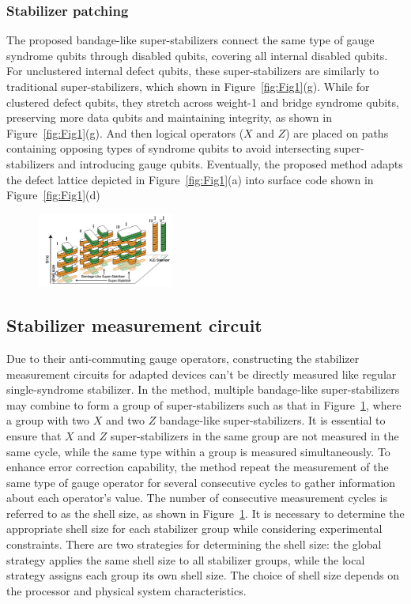 \subsubsection{Stabilizer patching}

The proposed bandage-like super-stabilizers connect the same type of gauge syndrome qubits through disabled qubits, covering all internal disabled qubits. For unclustered internal defect qubits, these super-stabilizers are similarly to traditional super-stabilizers, which shown in Figure~\ref{fig:Fig1}(g). While for clustered defect qubits, they stretch across weight-1 and bridge syndrome qubits, preserving more data qubits and maintaining integrity, as  shown in Figure~\ref{fig:Fig1}(g). And then logical operators ($X$ and $Z$) are placed on paths containing opposing types of syndrome qubits to avoid intersecting super-stabilizers and introducing gauge qubits. Eventually, the proposed method adapts the defect lattice depicted in Figure~\ref{fig:Fig1}(a) into surface code shown in Figure~\ref{fig:Fig1}(d)

\begin{figure}[ht]
    \centering
    \includegraphics[width=0.4\textwidth]{sections/4_stabilizer/Fig2.png}
    \caption{}
    \label{fig:Fig2}
\end{figure}

\subsection{Stabilizer measurement circuit} 

Due to their anti-commuting gauge operators, constructing the stabilizer measurement circuits for adapted devices can't be directly measured like regular single-syndrome stabilizer. In the method, multiple bandage-like super-stabilizers may combine to form a group of super-stabilizers such as that in Figure~\ref{fig:Fig2}, where a group with two $X$ and two $Z$ bandage-like super-stabilizers. It is essential to ensure that $X$ and $Z$ super-stabilizers in the same group are not measured in the same cycle, while the same type within a group is measured simultaneously.
To enhance error correction capability, the method repeat the measurement of the same type of gauge operator for several consecutive cycles to gather information about each operator's value. The number of consecutive measurement cycles is referred to as the shell size, as shown in Figure~\ref{fig:Fig2}. It is necessary to determine the appropriate shell size for each stabilizer group while considering experimental constraints. There are two strategies for determining the shell size: the global strategy applies the same shell size to all stabilizer groups, while the local strategy assigns each group its own shell size. The choice of shell size depends on the processor and physical system characteristics.

